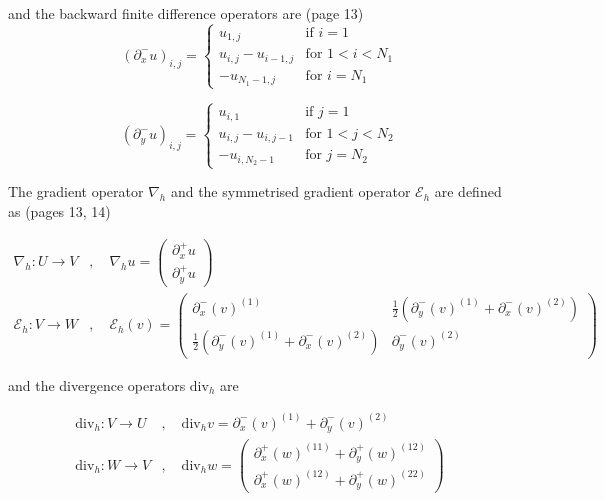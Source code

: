 and the backward finite difference operators are (page 13)
\begin{equation}
    (\partial_x^- u)_{i,j} = 
    \begin{cases}
    u_{1,j} & \text{if } i = 1 \\
    u_{i,j} - u_{i-1,j} & \text{for } 1 < i < N_1 \\
    -u_{N_1-1,j} & \text{for } i = N_1
    \end{cases}
\end{equation}
    
\begin{equation}
    (\partial_y^- u)_{i,j} = 
    \begin{cases}
    u_{i,1} & \text{if } j = 1 \\
    u_{i,j} - u_{i,j-1} & \text{for } 1 < j < N_2 \\
    -u_{i,N_2-1} & \text{for } j = N_2
    \end{cases}
\end{equation}






The gradient operator $\nabla_h$ and the symmetrised gradient operator $\mathcal{E}_h$ are defined as (pages 13, 14)

\begin{equation}
    \begin{aligned}
    \nabla_h : U \rightarrow V &, \quad \nabla_h u = 
    \begin{pmatrix}
    \partial_x^+ u \\
    \partial_y^+ u
    \end{pmatrix} \\
    \mathcal{E}_h : V \rightarrow W &, \quad \mathcal{E}_h (v) = 
    \begin{pmatrix}
    \partial_x^- (v)^{(1)} &
    \frac{1}{2} \left( \partial_y^- (v)^{(1)} + \partial_x^- (v)^{(2)} \right) \\
    \frac{1}{2} \left( \partial_y^- (v)^{(1)} + \partial_x^- (v)^{(2)} \right) &
    \partial_y^- (v)^{(2)}
    \end{pmatrix}
    \end{aligned}
\end{equation}

and the divergence operators $\mathrm{div}_h$ are


\begin{equation}
\begin{aligned}
\mathrm{div}_h : V \rightarrow U &, \quad \mathrm{div}_h v = \partial_x^- (v)^{(1)} + \partial_y^- (v)^{(2)} \\
\mathrm{div}_h : W \rightarrow V &, \quad \mathrm{div}_h w = 
\begin{pmatrix}
\partial_x^+ (w)^{(11)} + \partial_y^+ (w)^{(12)} \\
\partial_x^+ (w)^{(12)} + \partial_y^+ (w)^{(22)}
\end{pmatrix}
\end{aligned}
\end{equation}

